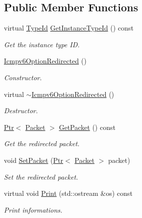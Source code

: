 \subsection*{Public Member Functions}
\begin{DoxyCompactItemize}
\item 
virtual \hyperlink{classns3_1_1TypeId}{Type\+Id} \hyperlink{classns3_1_1Icmpv6OptionRedirected_abcaa561570f54d5d324fbc2e98b9bb43}{Get\+Instance\+Type\+Id} () const 
\begin{DoxyCompactList}\small\item\em Get the instance type ID. \end{DoxyCompactList}\item 
\hyperlink{classns3_1_1Icmpv6OptionRedirected_a0cbcac6e92db5fef5d79230ef2908ac5}{Icmpv6\+Option\+Redirected} ()
\begin{DoxyCompactList}\small\item\em Constructor. \end{DoxyCompactList}\item 
virtual \hyperlink{classns3_1_1Icmpv6OptionRedirected_a67fffb37446211633b16439f684232d6}{$\sim$\+Icmpv6\+Option\+Redirected} ()
\begin{DoxyCompactList}\small\item\em Destructor. \end{DoxyCompactList}\item 
\hyperlink{classns3_1_1Ptr}{Ptr}$<$ \hyperlink{classns3_1_1Packet}{Packet} $>$ \hyperlink{classns3_1_1Icmpv6OptionRedirected_a77c14fb574266d63429ce98541fa9275}{Get\+Packet} () const 
\begin{DoxyCompactList}\small\item\em Get the redirected packet. \end{DoxyCompactList}\item 
void \hyperlink{classns3_1_1Icmpv6OptionRedirected_aa2097e9b9e6a39bca11e7189a9c4779c}{Set\+Packet} (\hyperlink{classns3_1_1Ptr}{Ptr}$<$ \hyperlink{classns3_1_1Packet}{Packet} $>$ packet)
\begin{DoxyCompactList}\small\item\em Set the redirected packet. \end{DoxyCompactList}\item 
virtual void \hyperlink{classns3_1_1Icmpv6OptionRedirected_ad5d024c4ca990632a092c998b3416dd5}{Print} (std\+::ostream \&os) const 
\begin{DoxyCompactList}\small\item\em Print informations. \end{DoxyCompactList}\item 

\end{DoxyCompactItemize}
